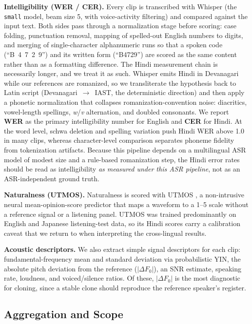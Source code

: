 \documentclass[conference]{IEEEtran}
\begin{document}
\textbf{Intelligibility (WER / CER).} Every clip is transcribed with Whisper
(the \texttt{small} model, beam size 5, with voice-activity filtering)
\cite{radford2023whisper} and compared against the input text. Both sides
pass through a normalization stage before scoring: case folding, punctuation
removal, mapping of spelled-out English numbers to digits, and merging of
single-character alphanumeric runs so that a spoken code (``B~4~7~2~9'') and
its written form (``B4729'') are scored as the same content rather than as a
formatting difference. The Hindi measurement chain is necessarily longer, and
we treat it as such. Whisper emits Hindi in Devanagari while our references
are romanized, so we transliterate the hypothesis back to Latin script
(Devanagari~$\rightarrow$~IAST, the deterministic direction) and then apply a
phonetic normalization that collapses romanization-convention noise:
diacritics, vowel-length spellings, \textit{w}/\textit{v} alternation, and
doubled consonants. We report \textbf{WER} as the primary intelligibility
number for English and \textbf{CER} for Hindi. At the word level, schwa
deletion and spelling variation push Hindi WER above 1.0 in many clips,
whereas character-level comparison separates phoneme fidelity from
tokenization artifacts. Because this pipeline depends on a multilingual ASR
model of modest size and a rule-based romanization step, the Hindi error
rates should be read as intelligibility \emph{as measured under this ASR
pipeline}, not as an ASR-independent ground truth.

\textbf{Naturalness (UTMOS).} Naturalness is scored with UTMOS
\cite{saeki2022utmos}, a non-intrusive neural mean-opinion-score predictor
that maps a waveform to a 1--5 scale without a reference signal or a
listening panel. UTMOS was trained predominantly on English and Japanese
listening-test data, so its Hindi scores carry a calibration caveat that we
return to when interpreting the cross-lingual results.

\textbf{Acoustic descriptors.} We also extract simple signal descriptors for
each clip: fundamental-frequency mean and standard deviation via
probabilistic YIN, the absolute pitch deviation from the reference
($|\Delta F_0|$), an SNR estimate, speaking rate, loudness, and
voiced/silence ratios. Of these, $|\Delta F_0|$ is the most diagnostic for
cloning, since a stable clone should reproduce the reference speaker's
register.

\subsection{Aggregation and Scope}
\label{sec:method-scope}
\end{document}
